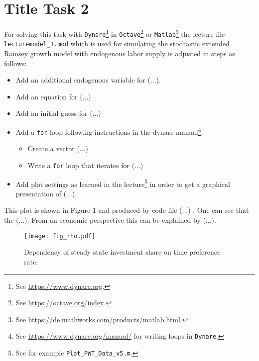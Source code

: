 \documentclass[12pt,a4paper,notitlepage]{article}
\numberwithin{equation}{section}
\begin{document}
\section{Title Task 2}
For solving this task with \texttt{Dynare}\footnote{See \url{https://www.dynare.org}. } in \texttt{Octave}\footnote{See \url {https://octave.org/index}.} or \texttt{Matlab}\footnote{See \url{https://de.mathworks.com/products/matlab.html}.} the lecture file \\ \texttt{lecturemodel\_1.mod} which is used for simulating the stochastic extended Ramsey growth model with endogenous labor supply is adjusted in steps as follows:
\begin{itemize}
	\item Add an additional endogenous variable for (...).
	\item Add an equation for (...)
	\item Add an initial guess for (...)
	\item Add a \texttt{for} loop following instructions in the dynare manual\footnote{See \url{https://www.dynare.org/manual/} for writing loops in \texttt{Dynare}.}:
	\begin{itemize}
		\item[1.] Create a vector (...)
		\item[2.] Write a \texttt{for} loop that iterates for (...)
	\end{itemize}
	\item Add plot settings as learned in the lecture\footnote{See for example \texttt{Plot\_PWT\_Data\_v5.m}.} in order to get a graphical presentation of (...).
\end{itemize}
This plot is shown in Figure 1 and produced by code file (...) . One can see that the (...). From an economic perspective this can be explained by (...).
\begin{figure} [H]
	\centering
	\texttt{[image: fig\_rho.pdf]}
	\label{fig:locally}
	\caption{Dependency of steady state investment share on time preference rate.}
\end{figure}
\end{document}
